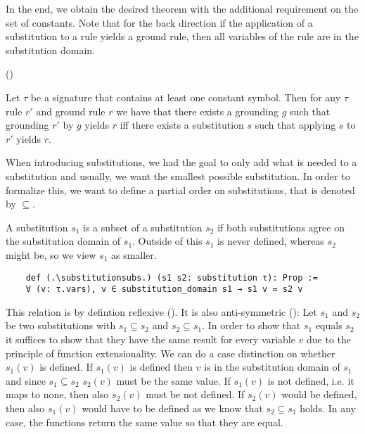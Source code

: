     In the end, we obtain the desired theorem with the additional requirement on the set of constants. Note that for the back direction if the application of a substitution to a rule yields a ground rule, then all variables of the rule are in the substitution domain. 
    
    \noindent(\applySubstitutionRuleIsGroundImplVarsSubsetDomain)
    \begin{theorem}[\groundingSubstitutionEquivalence]\label{trm:groundingSubstitutionEquivalence}
        Let $\tau$ be a signature that contains at least one constant symbol. Then for any $\tau$ rule $r'$ and ground rule $r$ we have that there exists a grounding $g$ such that grounding $r'$ by $g$ yields $r$ iff there exists a substitution $s$ such that applying $s$ to $r'$ yields $r$.
    \end{theorem}

    When introducing substitutions, we had the goal to only add what is needed to a substitution and usually, we want the smallest possible substitution. In order to formalize this, we want to define a partial order on substitutions, that is denoted by $\subseteq$.
    
    A substitution $s_1$ is a subset of a substitution $s_2$ if both substitutions agree on the substitution domain of $s_1$. Outside of this $s_1$ is never defined, whereas $s_2$ might be, so we view $s_1$ as smaller.

    \begin{lstlisting}
    def (.\substitutionsubs.) (s1 s2: substitution τ): Prop :=
    ∀ (v: τ.vars), v ∈ substitution_domain s1 → s1 v = s2 v
    \end{lstlisting}

    This relation is by defintion reflexive (\substitutionsubsrefl). It is also anti-symmetric (\substitutionsubsantisymm): Let $s_1$ and $s_2$ be two substitutions with $s_1 \subseteq s_2$ and $s_2 \subseteq s_1$. In order to show that $s_1$ equals $s_2$ it suffices to show that they have the same result for every variable $v$ due to the principle of function extensionality. We can do a case distinction on whether $s_1(v)$ is defined. If $s_1(v)$ is defined then $v$ is in the substitution domain of $s_1$ and since $s_1 \subseteq s_2$ $s_2(v)$ must be the same value. If $s_1(v)$ is not defined, i.e. it maps to none, then also $s_2(v)$ must be not defined. If $s_2(v)$ would be defined, then also $s_1(v)$ would have to be defined as we know that $s_2 \subseteq s_1$ holds. In any case, the functions return the same value so that they are equal.

